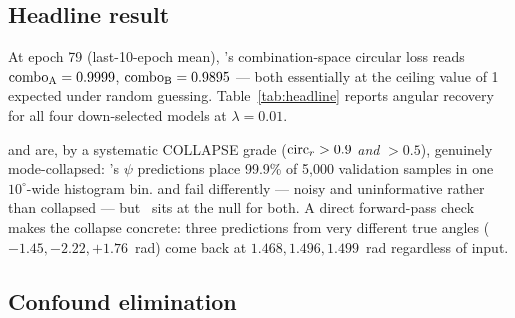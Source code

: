 \subsection{Headline result}
\label{sec:phicpsi:headline}

At epoch 79 (last-10-epoch mean), \pocB's combination-space circular loss reads $\text{combo}_\text{A}=0.9999$, $\text{combo}_\text{B}=0.9895$ --- both essentially at the ceiling value of 1 expected under random guessing.
Table~\ref{tab:headline} reports angular recovery for all four down-selected models at $\lambda=0.01$.

\begin{table}[tbp]
    \centering
    \caption{Periodic-head recovery, four down-selected models, $\lambda=0.01$.}
    \label{tab:headline}
\end{table}

\pocA and \pocB are, by a systematic COLLAPSE grade ($\text{circ}_r>0.9$ \emph{and} \MAEang$>0.5$), genuinely mode-collapsed: \pocB's $\psi$ predictions place 99.9\% of 5{,}000 validation samples in one $10^\circ$-wide histogram bin.
\Tcn and \cnnAttn fail differently --- noisy and uninformative rather than collapsed --- but \MAEang\ sits at the null for both.
A direct forward-pass check makes the collapse concrete: three \comboA predictions from very different true angles ($-1.45,-2.22,+1.76$~rad) come back at $1.468,1.496,1.499$~rad regardless of input.

\subsection{Confound elimination}
\label{sec:phicpsi:confounds}

